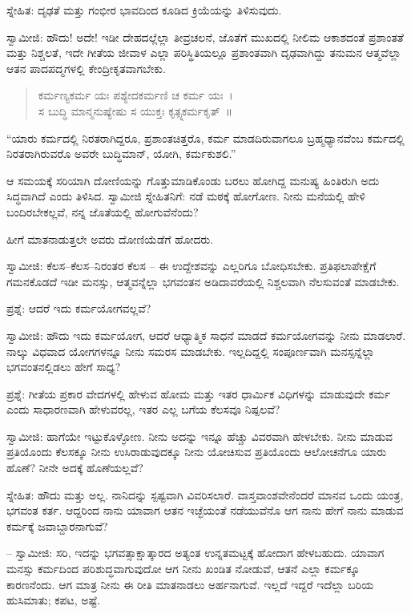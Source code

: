 ಸ್ನೇಹಿತ: ದೃಢತೆ ಮತ್ತು ಗಂಭೀರ ಭಾವದಿಂದ ಕೂಡಿದ ಕ್ರಿಯೆಯನ್ನು ತಿಳಿಸುವುದು.

ಸ್ವಾಮೀಜಿ: ಹೌದು! ಅದೇ! ಇಡೀ ದೇಹದಲ್ಲೆಲ್ಲಾ ತೀವ್ರಚಲನೆ, ಜೊತೆಗೆ ಮುಖದಲ್ಲಿ ನೀಲಿಮ ಆಕಾಶದಂತೆ ಪ್ರಶಾಂತತೆ ಮತ್ತು ನಿಶ್ಚಲತೆ, ಇದೇ ಗೀತೆಯ ಜೀವಾಳ ಎಲ್ಲಾ ಪರಿಸ್ಥಿತಿಯಲ್ಲೂ ಪ್ರಶಾಂತವಾಗಿ ದೃಢವಾಗಿದ್ದು ತನುಮನ ಆತ್ಮವೆಲ್ಲಾ ಆತನ ಪಾದಪದ್ಮಗಳಲ್ಲಿ ಕೇಂದ್ರೀಕೃತವಾಗಬೇಕು.

\begin{verse}
ಕರ್ಮಣ್ಯಕರ್ಮ ಯಃ ಪಶ್ಯೇದಕರ್ಮಣಿ ಚ ಕರ್ಮ ಯಃ~।\\ಸ ಬುದ್ಧಿ ಮಾನ್ಮನುಷ್ಯೇಷು ಸ ಯುಕ್ತಃ ಕೃತ್ಸ್ನಕರ್ಮಕೃತ್~॥
\end{verse}


“ಯಾರು ಕರ್ಮದಲ್ಲಿ ನಿರತರಾಗಿದ್ದರೂ, ಪ್ರಶಾಂತಚಿತ್ತರೊ, ಕರ್ಮ ಮಾಡದಿರುವಾಗಲೂ ಬ್ರಹ್ಮಧ್ಯಾನವೆಂಬ ಕರ್ಮದಲ್ಲಿ ನಿರತರಾಗಿರುವರೊ ಅವರೇ ಬುದ್ಧಿಮಾನ್, ಯೋಗಿ, ಕರ್ಮಕುಶಲಿ.”

ಆ ಸಮಯಕ್ಕೆ ಸರಿಯಾಗಿ ದೋಣಿಯನ್ನು ಗೊತ್ತುಮಾಡಿಕೊಂಡು ಬರಲು ಹೋಗಿದ್ದ ಮನುಷ್ಯ ಹಿಂತಿರುಗಿ ಅದು ಸಿದ್ಧವಾಗಿದೆ ಎಂದು ತಿಳಿಸಿದ. ಸ್ವಾಮೀಜಿ ಸ್ನೇಹಿತನಿಗೆ: ನಡೆ ಮಠಕ್ಕೆ ಹೋಗೋಣ. ನೀನು ಮನೆಯಲ್ಲಿ ಹೇಳಿ ಬಂದಿರಬೇಕಲ್ಲವೆ, ನನ್ನ ಜೊತೆಯಲ್ಲಿ ಹೋಗುವೆನೆಂದು?

ಹೀಗೆ ಮಾತನಾಡುತ್ತಲೇ ಅವರು ದೋಣಿಯೆಡೆಗೆ ಹೋದರು.

ಸ್ವಾಮೀಜಿ: ಕೆಲಸ–ಕೆಲಸ–ನಿರಂತರ ಕೆಲಸ – ಈ ಉದ್ದೇಶವನ್ನು ಎಲ್ಲರಿಗೂ ಬೋಧಿಸಬೇಕು. ಪ್ರತಿಫಲಾಪೇಕ್ಷೆಗೆ ಗಮನಕೊಡದೆ ಇಡೀ ಮನಸ್ಸು, ಆತ್ಮವನ್ನೆಲ್ಲಾ ಭಗವಂತನ ಅಡಿದಾವರೆಯಲ್ಲಿ ನಿಶ್ಚಲವಾಗಿ ನೆಲಸುವಂತೆ ಮಾಡಬೇಕು.

ಪ್ರಶ್ನೆ: ಆದರೆ ಇದು ಕರ್ಮಯೋಗವಲ್ಲವೆ?

ಸ್ವಾಮೀಜಿ: ಹೌದು ಇದು ಕರ್ಮಯೋಗ, ಆದರೆ ಆಧ್ಯಾತ್ಮಿಕ ಸಾಧನೆ ಮಾಡದೆ ಕರ್ಮಯೋಗವನ್ನು ನೀನು ಮಾಡಲಾರೆ. ನಾಲ್ಕು ವಿಧವಾದ ಯೋಗಗಳನ್ನೂ ನೀನು ಸಮರಸ ಮಾಡಬೇಕು. ಇಲ್ಲದಿದ್ದಲ್ಲಿ ಸಂಪೂರ್ಣವಾಗಿ ಮನಸ್ಸನ್ನೆಲ್ಲಾ ಭಗವಂತನಲ್ಲಿಡಲು ಹೇಗೆ ಸಾಧ್ಯ?

ಪ್ರಶ್ನೆ: ಗೀತೆಯ ಪ್ರಕಾರ ವೇದಗಳಲ್ಲಿ ಹೇಳುವ ಹೋಮ ಮತ್ತು ಇತರ ಧಾರ್ಮಿಕ ವಿಧಿಗಳನ್ನು ಮಾಡುವುದೇ ಕರ್ಮ ಎಂದು ಸಾಧಾರಣವಾಗಿ ಹೇಳುವರಲ್ಲ, ಇತರ ಎಲ್ಲ ಬಗೆಯ ಕೆಲಸವೂ ನಿಷ್ಪಲವೆ?

ಸ್ವಾಮೀಜಿ: ಹಾಗೆಯೇ ಇಟ್ಟುಕೊಳ್ಳೋಣ. ನೀನು ಅದನ್ನು ಇನ್ನೂ ಹೆಚ್ಚು ವಿವರವಾಗಿ ಹೇಳಬೇಕು. ನೀನು ಮಾಡುವ ಪ್ರತಿಯೊಂದು ಕೆಲಸಕ್ಕೂ ನೀನು ಉಸಿರಾಡುವುದಕ್ಕೂ ನೀನು ಯೋಚಿಸುವ ಪ್ರತಿಯೊಂದು ಆಲೋಚನೆಗೂ ಯಾರು ಹೊಣೆ? ನೀನೇ ಅದಕ್ಕೆ ಹೊಣೆಯಲ್ಲವೆ?

ಸ್ನೇಹಿತ: ಹೌದು ಮತ್ತು ಅಲ್ಲ. ನಾನಿದನ್ನು ಸ್ಪಷ್ಟವಾಗಿ ವಿವರಿಸಲಾರೆ. ವಾಸ್ತವಾಂಶವೇನೆಂದರೆ ಮಾನವ ಒಂದು ಯಂತ್ರ, ಭಗವಂತ ಕರ್ತ. ಆದ್ದರಿಂದ ನಾನು ಯಾವಾಗ ಆತನ ಇಚ್ಛೆಯಂತೆ ನಡೆಯುವೆನೊ ಆಗ ನಾನು ಹೇಗೆ ನಾನು ಮಾಡುವ ಕರ್ಮಕ್ಕೆ ಜವಾಬ್ದಾರನಾಗುವೆ?

– ಸ್ವಾಮೀಜಿ: ಸರಿ, ಇದನ್ನು ಭಗವತ್ಸಾಕ್ಷಾತ್ಕಾರದ ಅತ್ಯಂತ ಉನ್ನತಮಟ್ಟಕ್ಕೆ ಹೋದಾಗ ಹೇಳಬಹುದು. ಯಾವಾಗ ಮನಸ್ಸು ಕರ್ಮದಿಂದ ಪರಿಶುದ್ಧವಾಗುವುದೋ ಆಗ ನೀನು ಖಂಡಿತ ನೋಡುವೆ, ಆತನೆ ಎಲ್ಲಾ ಕರ್ಮಕ್ಕೂ ಕಾರಣನೆಂದು. ಆಗ ಮಾತ್ರ ನೀನು ಈ ರೀತಿ ಮಾತನಾಡಲು ಅರ್ಹನಾಗುವೆ. ಇಲ್ಲದೆ ಇದ್ದರೆ ಇದೆಲ್ಲಾ ಬರಿಯ ಹುಸಿಮಾತು; ಕಪಟ, ಅಷ್ಟೆ.

